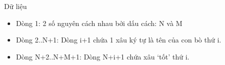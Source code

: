 Dữ liệu
\begin{itemize}
	\item     Dòng 1: 2 số nguyên cách nhau bởi dấu cách: N và M   
	\item     Dòng 2..N+1: Dòng i+1 chứa 1 xâu ký tự là tên của con bò thứ i.   
	\item     Dòng N+2..N+M+1: Dòng N+i+1 chứa xâu ‘tốt’ thứ i.   
\end{itemize}